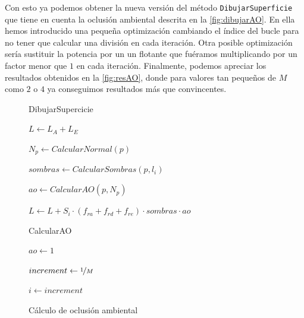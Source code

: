 Con esto ya podemos obtener la nueva versión del método \texttt{DibujarSuperficie} que tiene en cuenta la oclusión ambiental descrita en la \autoref{fig:dibujarAO}. En ella hemos introducido una pequeña optimización \cite{ao_opt} cambiando el índice del bucle para no tener que calcular una división en cada iteración. Otra posible optimización sería sustituir la potencia por un un flotante que fuéramos multiplicando por un factor menor que $1$ en cada iteración. Finalmente, podemos apreciar los resultados obtenidos en la \autoref{fig:resAO}, donde para valores tan pequeños de $M$ como $2$ o $4$ ya conseguimos resultados más que convincentes.


\begin{figure}
    \centering
        
    \begin{algorithm}[H]
        \caption{DibujarSupercicie}\label{alg:fsFinal}
            $L \gets L_A + L_E$ 
             {
    
                
                $N_p \gets CalcularNormal(p)$
                
                $sombras \gets CalcularSombras(p, l_i)$
                
                $ao \gets CalcularAO(p, N_p)$
    
                $L \gets L + S_i\cdot (f_{ra} + f_{rd} + f_{re})\cdot sombras \cdot ao$
            }
    
    \end{algorithm}
    
    \begin{algorithm}[H]
        \caption{CalcularAO}
            $ao \gets 1$
                    
            $increment \gets \nicefrac{1}{M}$
            
            $i\gets increment$
        
                
    \end{algorithm}
    
    \caption{Cálculo de oclusión ambiental}
    \label{fig:dibujarAO}
\end{figure}


